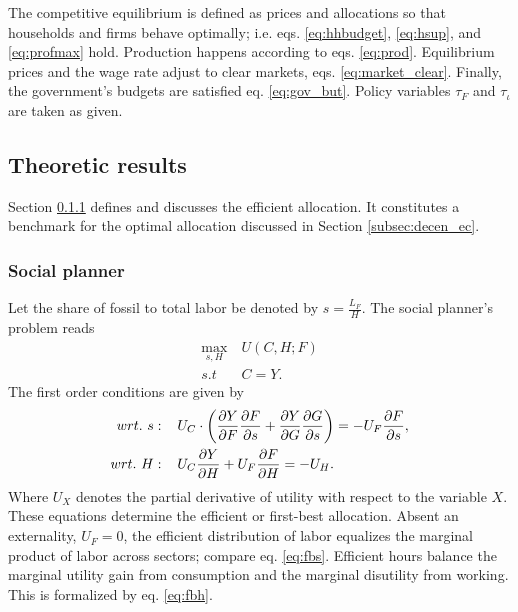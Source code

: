 The competitive equilibrium is defined as prices and allocations so that households and firms behave optimally; i.e. eqs. \eqref{eq:hhbudget}, \eqref{eq:hsup}, and \eqref{eq:profmax} hold. Production happens according to eqs. \eqref{eq:prod}.  Equilibrium prices and the wage rate adjust to clear markets, eqs. \eqref{eq:market_clear}. Finally, the government's budgets are satisfied eq. \eqref{eq:gov_but}. Policy variables $\tau_F$ and $\tau_\iota$ are taken as given. 

\subsection{Theoretic results}\label{sec:theory}
Section \ref{subsec:sp} defines and discusses the efficient allocation. It constitutes a benchmark for the optimal allocation discussed in Section \ref{subsec:decen_ec}. 

\subsubsection{Social planner}\label{subsec:sp}
Let the share of fossil to total labor be denoted by $s=\frac{L_F}{H}$. The social planner's problem reads
\begin{align*}
\underset{s, H}{\max}\ & U(C,H; F)\\ s.t\ \ & C=Y.
\end{align*}
The first order conditions are given by
\begin{align}
wrt.\ s:\hspace{4mm} & U_C \cdot \left(\frac{\partial{Y}}{\partial{F}}\frac{\partial{F}}{\partial{s}}+\frac{\partial{Y}}{\partial{G}}\frac{\partial{G}}{\partial{s}}\right)=-U_F\frac{\partial{F}}{\partial{s}}, \label{eq:fbs}
\\
wrt.\ H:\hspace{4mm} & U_C\frac{\partial{Y}}{\partial{H}}+U_F\frac{\partial{F}}{\partial{H}}=-U_H\label{eq:fbh}. 
\end{align}
Where $U_X$ denotes the partial derivative of utility with respect to the variable $X$.
These equations determine the efficient or first-best allocation. 
Absent an externality, $U_F=0$, the efficient distribution of labor equalizes the marginal product of labor across sectors; compare eq. \eqref{eq:fbs}. Efficient hours balance the marginal utility gain from consumption and the marginal disutility from working. This is formalized by eq. \eqref{eq:fbh}. 

